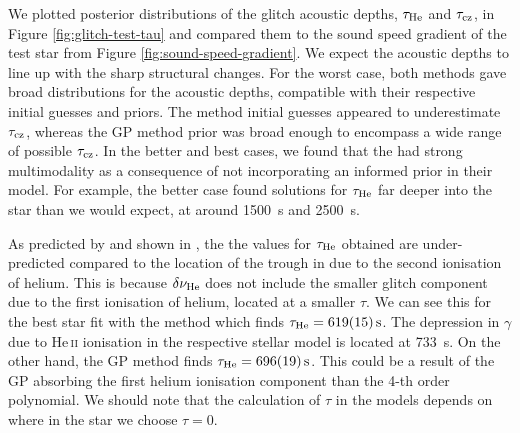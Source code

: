 We plotted posterior distributions of the glitch acoustic depths, \(\tau_\helium\) and \(\tau_\bcz\), in Figure \ref{fig:glitch-test-tau} and compared them to the sound speed gradient of the test star from Figure \ref{fig:sound-speed-gradient}. We expect the acoustic depths to line up with the sharp structural changes. For the worst case, both methods gave broad distributions for the acoustic depths, compatible with their respective initial guesses and priors. The  method initial guesses appeared to underestimate \(\tau_\bcz\), whereas the GP method prior was broad enough to encompass a wide range of possible \(\tau_\bcz\). In the better and best cases, we found that the  had strong multimodality as a consequence of not incorporating an informed prior in their model. For example, the better case found solutions for \(\tau_\helium\) far deeper into the star than we would expect, at around \SI{1500}{\second} and \SI{2500}{\second}.

As predicted by \citet{Houdek.Gough2007} and shown in \citet{Verma.Faria.ea2014}, the the values for \(\tau_\helium\) obtained are under-predicted compared to the location of the trough in due to the second ionisation of helium. This is because \(\delta\nu_\helium\) does not include the smaller glitch component due to the first ionisation of helium, located at a smaller \(\tau\). We can see this for the best star fit with the  method which finds \(\tau_\helium = \SI{619(15)}{\second}\). The depression in \(\gamma\) due to He\,\textsc{ii} ionisation in the respective stellar model is located at \SI{733}{\second}. On the other hand, the GP method finds \(\tau_\helium = \SI{696(19)}{\second}\). This could be a result of the GP absorbing the first helium ionisation component than the 4-th order polynomial. We should note that the calculation of \(\tau\) in the models depends on where in the star we choose \(\tau=0\).



